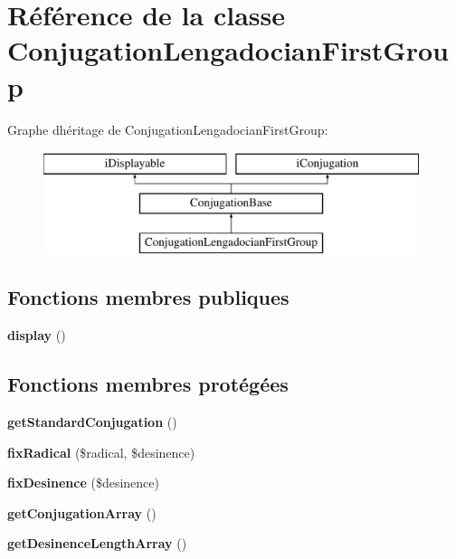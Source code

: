 \hypertarget{classConjugationLengadocianFirstGroup}{}\section{Référence de la classe Conjugation\+Lengadocian\+First\+Group}
\label{classConjugationLengadocianFirstGroup}
Graphe d\textquotesingle{}héritage de Conjugation\+Lengadocian\+First\+Group\+:\begin{figure}[H]
\begin{center}
\leavevmode
\includegraphics[height=3.000000cm]{classConjugationLengadocianFirstGroup}
\end{center}
\end{figure}
\subsection*{Fonctions membres publiques}
\begin{DoxyCompactItemize}
\item 
\hypertarget{classConjugationLengadocianFirstGroup_adca5561baef16d3a70d8ee40987bc5c0}{}\label{classConjugationLengadocianFirstGroup_adca5561baef16d3a70d8ee40987bc5c0} 
{\bfseries display} ()
\end{DoxyCompactItemize}
\subsection*{Fonctions membres protégées}
\begin{DoxyCompactItemize}
\item 
\hypertarget{classConjugationLengadocianFirstGroup_a3728df26c35bff9d1f74dd0825b30873}{}\label{classConjugationLengadocianFirstGroup_a3728df26c35bff9d1f74dd0825b30873} 
{\bfseries get\+Standard\+Conjugation} ()
\item 
\hypertarget{classConjugationLengadocianFirstGroup_ac9e14d59dc07f35e204efa14bd00d903}{}\label{classConjugationLengadocianFirstGroup_ac9e14d59dc07f35e204efa14bd00d903} 
{\bfseries fix\+Radical} (\$radical, \$desinence)
\item 
\hypertarget{classConjugationLengadocianFirstGroup_a7e9cdca67d8ed30db1ef7547c61f38da}{}\label{classConjugationLengadocianFirstGroup_a7e9cdca67d8ed30db1ef7547c61f38da} 
{\bfseries fix\+Desinence} (\$desinence)
\item 
\hypertarget{classConjugationLengadocianFirstGroup_a99becd6debfe143a6577f1ba7b063d58}{}\label{classConjugationLengadocianFirstGroup_a99becd6debfe143a6577f1ba7b063d58} 
{\bfseries get\+Conjugation\+Array} ()
\item 
\hypertarget{classConjugationLengadocianFirstGroup_a292ace5003eeb35711157918cde3c459}{}\label{classConjugationLengadocianFirstGroup_a292ace5003eeb35711157918cde3c459} 
{\bfseries get\+Desinence\+Length\+Array} ()
\end{DoxyCompactItemize}
